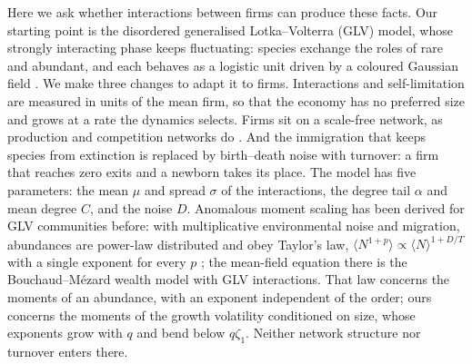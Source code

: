 \documentclass[pre,twocolumn,superscriptaddress,nofootinbib]{revtex4-2}
\begin{document}
Here we ask whether interactions between firms can produce these facts.  Our starting point is the
disordered generalised Lotka--Volterra (GLV) model, whose strongly interacting phase keeps
fluctuating: species exchange the roles of rare and abundant, and each behaves as a logistic unit
driven by a coloured Gaussian field \cite{roy2020,mallmin2024,arnouxbunin2024}.  We make three
changes to adapt it to firms.  Interactions and self-limitation are measured in units of the mean
firm, so that the economy has no preferred size and grows at a rate the dynamics selects.  Firms
sit on a scale-free network, as production and competition networks do
\cite{acemoglu2012,carvalho2019}.  And the immigration that keeps species from extinction is
replaced by birth--death noise with turnover: a firm that reaches zero exits and a newborn takes its
place.  The model has five parameters: the mean $\mu$ and spread $\sigma$ of the interactions, the
degree tail $\alpha$ and mean degree $C$, and the noise $D$.  Anomalous moment scaling has been derived
for GLV communities before: with multiplicative environmental noise and migration, abundances are
power-law distributed and obey Taylor's law, $\langle N^{1+p}\rangle\propto\langle N\rangle^{1+D/T}$ with
a single exponent for every $p$ \cite{alhiyasat2026}; the mean-field equation there is the
Bouchaud--M\'ezard wealth model \cite{bouchaudmezard2000} with GLV interactions.  That law concerns
the moments of an abundance, with an exponent independent of the order; ours concerns the moments of
the growth volatility conditioned on size, whose exponents grow with $q$ and bend below $q\zeta_1$.
Neither network structure nor turnover enters there.
\end{document}
